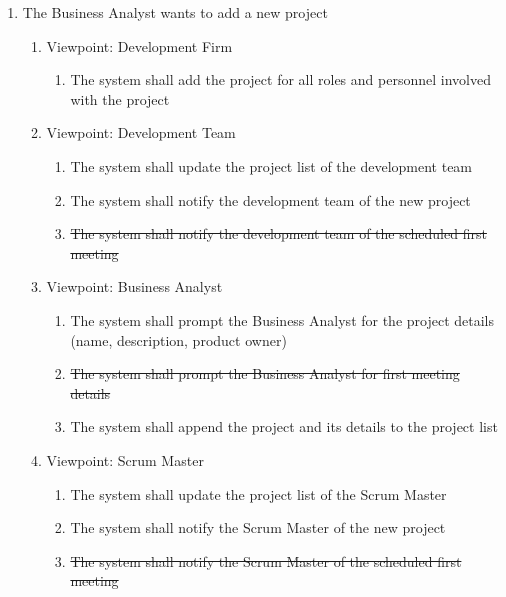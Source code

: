 \documentclass[12pt, titlepage]{article}
\begin{document}
\begin{enumerate}[{BE}1.]
	\item The Business Analyst wants to add a new project
	\begin{enumerate}[{VP}1.] 
	    \item Viewpoint: Development Firm
	        \begin{enumerate}
	            \item The system shall add the project for all roles and personnel involved with the project
	        \end{enumerate}
	    \item Viewpoint: Development Team
	        \begin{enumerate}
	            \item The system shall update the project list of the development team
	            \item The system shall notify the development team of the new project
	            \item \sout{The system shall notify the development team of the scheduled first meeting}
	        \end{enumerate}
		\item Viewpoint: Business Analyst
			\begin{enumerate}
			    \item The system shall prompt the Business Analyst for the project details (name, description, product owner)
			    \item \sout{The system shall prompt the Business Analyst for first meeting details}
			    \item The system shall append the project and its details to the project list
			\end{enumerate}
		\item Viewpoint: Scrum Master
			\begin{enumerate}
			    \item The system shall update the project list of the Scrum Master
			    \item The system shall notify the Scrum Master of the new project
			    \item \sout{The system shall notify the Scrum Master of the scheduled first meeting}
			\end{enumerate}
	\end{enumerate}


\end{enumerate}
\end{document}
